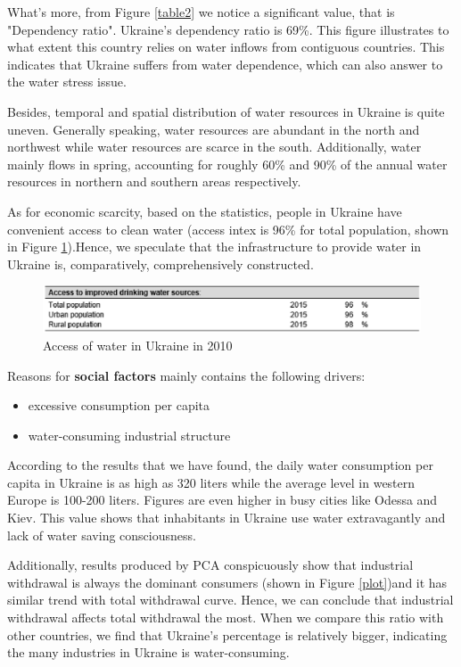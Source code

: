 What's more, from Figure \ref{table2} we notice a significant value, that is "Dependency ratio". Ukraine's dependency ratio is 69\%. This figure illustrates to what extent this country relies on water inflows from contiguous countries. This indicates that Ukraine suffers from water dependence, which can also answer to the water stress issue.

Besides, temporal and spatial distribution of water resources in Ukraine is quite uneven. Generally speaking, water resources are abundant in the north and northwest while water resources are scarce in the south. Additionally, water mainly flows in spring, accounting for roughly 60\% and 90\% of the annual water resources in northern and southern areas respectively.

As for economic scarcity, based on the statistics, people in Ukraine have convenient access to clean water (access intex is 96\% for total population, shown in Figure \ref{plot11}).Hence, we speculate that the infrastructure to provide water in Ukraine is, comparatively, comprehensively constructed.

\begin{figure}[hp]
\small
\centering
\includegraphics[width=12cm]{./picture/plot11.eps}
\caption{Access of water in Ukraine in 2010} \label{plot11}
\end{figure}

Reasons for \textbf{social factors} mainly contains the following drivers:
\begin{itemize}
\item excessive consumption per capita
\item water-consuming industrial structure
\end{itemize}

According to the results that we have found, the daily water consumption per capita in Ukraine is as high as 320 liters while the average level in western Europe is 100-200 liters. Figures are even higher in busy cities like Odessa and Kiev. This value shows that inhabitants in Ukraine use water extravagantly and lack of water saving consciousness.

Additionally, results produced by PCA conspicuously show that industrial withdrawal is always the dominant consumers (shown in Figure \ref{plot})and it has similar trend with total withdrawal curve. Hence, we can conclude that industrial withdrawal affects total withdrawal the most. When we compare this ratio with other countries, we find that Ukraine's percentage is relatively bigger, indicating the many industries in Ukraine is water-consuming.

